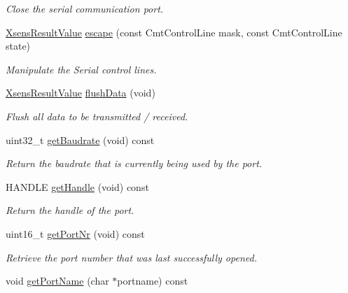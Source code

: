 \begin{DoxyCompactItemize}
\begin{DoxyCompactList}\small\item\em \-Close the serial communication port. \end{DoxyCompactList}\item 
\hyperlink{group__enums_ga822a2260a20af524029eef9e9a51ff6f}{\-Xsens\-Result\-Value} \hyperlink{classxsens_1_1Cmt1s_a59ea4755515aee0d93c76fd1298388f0}{escape} (const \-Cmt\-Control\-Line mask, const \-Cmt\-Control\-Line state)
\begin{DoxyCompactList}\small\item\em \-Manipulate the \-Serial control lines. \end{DoxyCompactList}\item 
\hyperlink{group__enums_ga822a2260a20af524029eef9e9a51ff6f}{\-Xsens\-Result\-Value} \hyperlink{classxsens_1_1Cmt1s_a99c68d96454c25926a8c21fe0f47538c}{flush\-Data} (void)
\begin{DoxyCompactList}\small\item\em \-Flush all data to be transmitted / received. \end{DoxyCompactList}\item 
\hypertarget{classxsens_1_1Cmt1s_a2fa3c6574b80034820b837536ad04ceb}{uint32\-\_\-t \hyperlink{classxsens_1_1Cmt1s_a2fa3c6574b80034820b837536ad04ceb}{get\-Baudrate} (void) const }\label{classxsens_1_1Cmt1s_a2fa3c6574b80034820b837536ad04ceb}

\begin{DoxyCompactList}\small\item\em \-Return the baudrate that is currently being used by the port. \end{DoxyCompactList}\item 
\hypertarget{classxsens_1_1Cmt1s_aaecc76cad90f7d0bef178d978f02784e}{\-H\-A\-N\-D\-L\-E \hyperlink{classxsens_1_1Cmt1s_aaecc76cad90f7d0bef178d978f02784e}{get\-Handle} (void) const }\label{classxsens_1_1Cmt1s_aaecc76cad90f7d0bef178d978f02784e}

\begin{DoxyCompactList}\small\item\em \-Return the handle of the port. \end{DoxyCompactList}\item 
\hypertarget{classxsens_1_1Cmt1s_ae00b8e70bae432cfc149c83a7cc24887}{uint16\-\_\-t \hyperlink{classxsens_1_1Cmt1s_ae00b8e70bae432cfc149c83a7cc24887}{get\-Port\-Nr} (void) const }\label{classxsens_1_1Cmt1s_ae00b8e70bae432cfc149c83a7cc24887}

\begin{DoxyCompactList}\small\item\em \-Retrieve the port number that was last successfully opened. \end{DoxyCompactList}\item 
\hypertarget{classxsens_1_1Cmt1s_a047ed451689538e7e2e99f248b094a6f}{void \hyperlink{classxsens_1_1Cmt1s_a047ed451689538e7e2e99f248b094a6f}{get\-Port\-Name} (char $\ast$portname) const }\label{classxsens_1_1Cmt1s_a047ed451689538e7e2e99f248b094a6f}


\end{DoxyCompactItemize}
